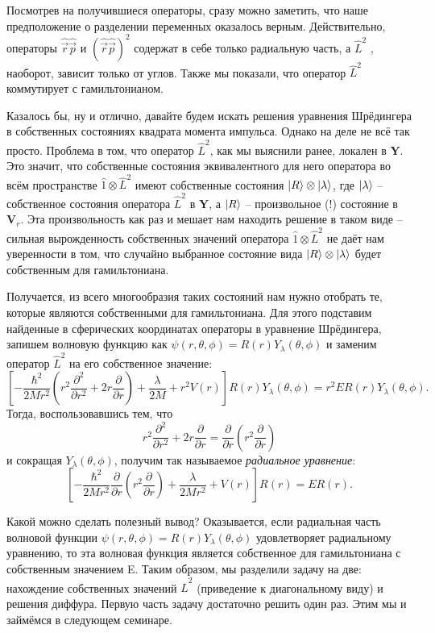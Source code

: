 Посмотрев на получившиеся операторы, сразу можно заметить, что наше предположение о разделении переменных оказалось верным. Действительно, операторы $\hat{\Vec{r}}\hat{\Vec{p}}$ и $(\hat{\Vec{r}}\hat{\Vec{p}})^2$ содержат в себе только радиальную часть, а $\hat{L}^2$ , наоборот, зависит только от углов. Также мы показали, что оператор $\hat{L}^2$ коммутирует с гамильтонианом. 

Казалось бы, ну и отлично, давайте будем искать решения уравнения Шрёдингера в собственных состояниях квадрата момента импульса. Однако на деле не всё так просто. Проблема в том, что оператор $\hat{L}^2$, как мы выяснили ранее, локален в $\mathbf{Y}$. Это значит, что собственные состояния эквивалентного для него оператора во всём пространстве $\hat{1}\otimes\hat{L}^2$ имеют собственные состояния $\ket{R}\otimes\ket{\lambda}$, где $\ket{\lambda}$ -- собственное состояния оператора $\hat{L}^2$ в $\mathbf{Y}$, а $\ket{R}$ -- произвольное (!) состояние в $\mathbf{V}_r$. Эта произвольность как раз и мешает нам находить решение в таком виде -- сильная вырожденность собственных значений оператора $\hat{1}\otimes\hat{L}^2$ не даёт нам уверенности в том, что случайно выбранное состояние вида $\ket{R}\otimes\ket{\lambda}$ будет собственным для гамильтониана. 

Получается, из всего многообразия таких состояний нам нужно отобрать те, которые являются собственными для гамильтониана. Для этого подставим найденные в сферических координатах операторы в уравнение Шрёдингера, запишем волновую функцию как $\psi(r, \theta, \phi) = R(r)Y_{\lambda}(\theta, \phi)$ и заменим оператор $\hat{L}^2$ на его собственное значение: 
\[
\left[-\frac{\hbar^2}{2Mr^2}\left( r^2\frac{\partial^2}{\partial r^2} + 2r\frac{\partial}{\partial r} \right)  + \frac{\lambda}{2M} + r^2V(r)\right]R(r)Y_{\lambda}(\theta, \phi) = r^2ER(r)Y_{\lambda}(\theta, \phi).
\]
Тогда, воспользовавшись тем, что 
\[
r^2\frac{\partial^2}{\partial r^2} + 2r\frac{\partial}{\partial r} = \frac{\partial}{\partial r}\left( r^2 \frac{\partial}{\partial r}\right)
\]
и сокращая $Y_{\lambda}(\theta, \phi)$, получим так называемое \textit{радиальное уравнение}:
\[
\left[-\frac{\hbar^2}{2Mr^2}\frac{\partial}{\partial r}\left( r^2 \frac{\partial}{\partial r}\right)  + \frac{\lambda}{2Mr^2} + V(r)\right]R(r) = ER(r).
\]

Какой можно сделать полезный вывод? Оказывается, если радиальная часть волновой функции $\psi(r, \theta, \phi) = R(r)Y_{\lambda}(\theta, \phi)$ удовлетворяет радиальному уравнению, то эта волновая функция является собственное для гамильтониана с собственным значением E. Таким образом, мы разделили задачу на две: нахождение собственных значений $\hat{L}^2$ (приведение к диагональному виду) и решения диффура. Первую часть задачу достаточно решить один раз. Этим мы и займёмся в следующем семинаре.